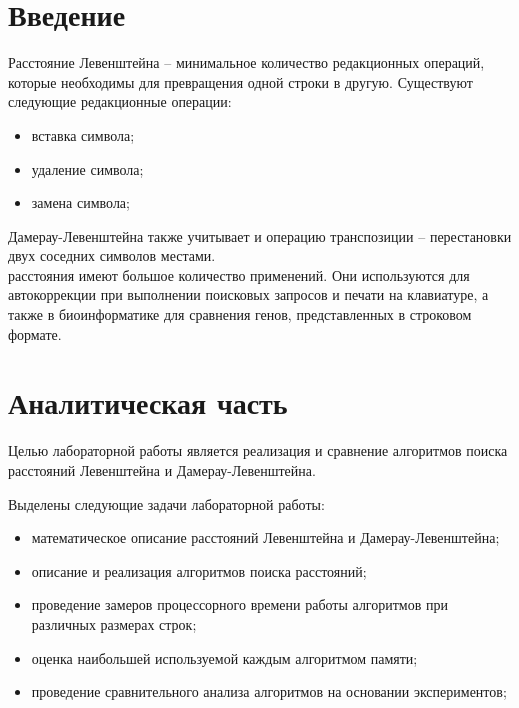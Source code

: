 \documentclass[10pt,a4paper]{report}
\begin{document}
	
%	
	
	\tableofcontents
	\newpage

	\chapter*{Введение}
	Расстояние Левенштейна – минимальное количество редакционных операций, которые необходимы для превращения одной строки в другую. Существуют следующие редакционные операции:
	\begin{itemize}
	\item вставка символа;
	\item удаление символа;
	\item замена символа;
	\end{itemize}

	 Дамерау-Левенштейна также учитывает и операцию транспозиции – перестановки двух соседних символов местами.\\
	 расстояния имеют большое количество применений. Они используются для автокоррекции при выполнении поисковых запросов и печати на клавиатуре, а также в биоинформатике для сравнения генов, представленных в строковом формате.
	
	\newpage
	\chapter{Аналитическая часть}
	Целью лабораторной работы является реализация и сравнение алгоритмов поиска расстояний Левенштейна и Дамерау-Левенштейна.
	
	Выделены следующие задачи лабораторной работы:
	
	\begin{itemize}
	\item математическое описание расстояний Левенштейна 
	и Дамерау-Левенштейна;
	\item описание и реализация алгоритмов поиска расстояний;
	\item проведение замеров процессорного времени работы алгоритмов при различных размерах строк;
	\item оценка наибольшей используемой каждым алгоритмом памяти;
	\item проведение сравнительного анализа алгоритмов на основании экспериментов;
	\end{itemize}
\end{document}
